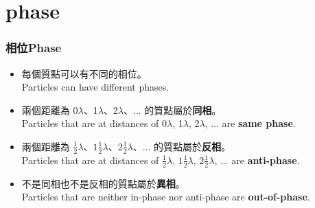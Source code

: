 \documentclass[beamer=true]{standalone}
\begin{document}


\section{phase}
\begin{frame}
    \frametitle{相位Phase}

    \begin{itemize}
        \item 每個質點可以有不同的相位。\\Particles can have different phases.
        \item 兩個距離為 0$\lambda$、1$\lambda$、2$\lambda$、... 的質點屬於\textbf{同相}。
              \\Particles that are at distances of 0$\lambda$, 1$\lambda$, 2$\lambda$, ... are \textbf{same phase}.
        \item 兩個距離為 $\frac{1}{2}\lambda$、$1\frac{1}{2}\lambda$、$2\frac{1}{2}\lambda$、... 的質點屬於\textbf{反相}。\\Particles that are at distances of $\frac{1}{2}\lambda$, $1\frac{1}{2}\lambda$, $2\frac{1}{2}\lambda$, ... are \textbf{anti-phase}.
        \item 不是同相也不是反相的質點屬於\textbf{異相}。\\Particles that are neither in-phase nor anti-phase are \textbf{out-of-phase}.
    \end{itemize}
\end{frame}
\end{document}
